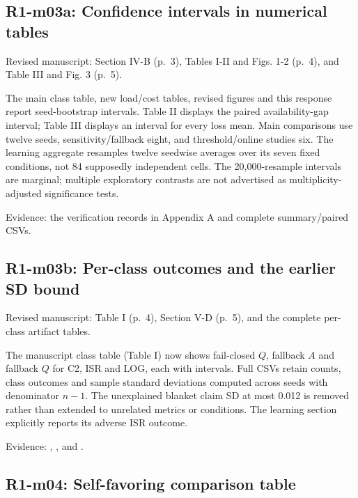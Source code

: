 \documentclass[a4paper,11pt]{article}
\begin{document}
\subsection{R1-m03a: Confidence intervals in numerical tables}\label{r1-m03a-confidence-intervals-in-numerical-tables}

Revised manuscript: Section IV-B (p.~3), Tables I-II and Figs. 1-2 (p.~4), and Table III and Fig. 3 (p.~5).

The main class table, new load/cost tables, revised figures and this response report seed-bootstrap intervals. Table II displays the paired availability-gap interval; Table III displays an interval for every loss mean. Main comparisons use twelve seeds, sensitivity/fallback eight, and threshold/online studies six. The learning aggregate resamples twelve seedwise averages over its seven fixed conditions, not 84 supposedly independent cells. The 20,000-resample intervals are marginal; multiple exploratory contrasts are not advertised as multiplicity-adjusted significance tests.

Evidence: the verification records in Appendix A and complete summary/paired CSVs.

\subsection{R1-m03b: Per-class outcomes and the earlier SD bound}\label{r1-m03b-per-class-outcomes-and-the-earlier-sd-bound}

Revised manuscript: Table I (p.~4), Section V-D (p.~5), and the complete per-class artifact tables.

The manuscript class table (Table I) now shows fail-closed \(Q\), fallback \(A\) and fallback \(Q\) for C2, ISR and LOG, each with intervals. Full CSVs retain counts, class outcomes and sample standard deviations computed across seeds with denominator \(n-1\). The unexplained blanket claim SD at most 0.012 is removed rather than extended to unrelated metrics or conditions. The learning section explicitly reports its adverse ISR outcome.

Evidence: , , and .

\subsection{R1-m04: Self-favoring comparison table}\label{r1-m04-self-favoring-comparison-table}
\end{document}
